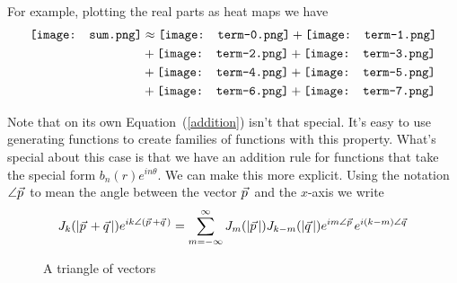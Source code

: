 \documentclass{article}
\newcommand\myvec[1]{\vec{#1}\hspace{0.5mm}}
\begin{document}
For example, plotting the real parts as heat maps we have
\begin{equation*}
\begin{split}
\raisebox{-\height/2+\dp\strutbox}{\texttt{[image: sum.png]}}
& \approx
\raisebox{-\height/2+\dp\strutbox}{\texttt{[image: term-0.png]}}
+
\raisebox{-\height/2+\dp\strutbox}{\texttt{[image: term-1.png]}}\\
& +
\raisebox{-\height/2+\dp\strutbox}{\texttt{[image: term-2.png]}}
+
\raisebox{-\height/2+\dp\strutbox}{\texttt{[image: term-3.png]}} \\
& +
\raisebox{-\height/2+\dp\strutbox}{\texttt{[image: term-4.png]}}
+
\raisebox{-\height/2+\dp\strutbox}{\texttt{[image: term-5.png]}} \\
& +
\raisebox{-\height/2+\dp\strutbox}{\texttt{[image: term-6.png]}}
+
\raisebox{-\height/2+\dp\strutbox}{\texttt{[image: term-7.png]}}
\end{split}
\end{equation*}

Note that on its own Equation~(\ref{addition}) isn't that special.
It's easy to use generating functions to create families of functions with this property.
What's special about this case is that we have an addition rule for functions that take the special form $b_n(r)e^{in\theta}$.
We can make this more explicit.
Using the notation $\angle\myvec{p}$ to mean the angle between the vector $\myvec{p}$ and the $x$-axis we write
\[
J_k(|\myvec{p}+\myvec{q}|)e^{ik\angle(\myvec{p}+\myvec{q})} = \sum_{m=-\infty}^\infty J_m(|\myvec{p}|)J_{k-m}(|\myvec{q}|)e^{im\angle\myvec{p}}e^{i(k-m)\angle\myvec{q}}
\]

\begin{figure}
\centering
{}
\caption{A triangle of vectors}
\label{triangle}
\end{figure}
\end{document}
